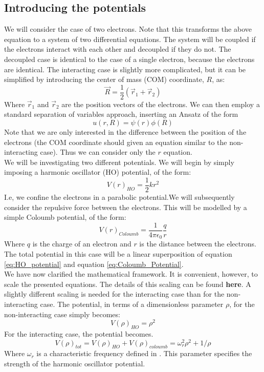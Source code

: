 \documentclass[a4paper, 10pt]{article}
\begin{document}
\subsection{Introducing the potentials}
We will consider the case of two electrons. Note that this transforms the above equation to a system of two differential equations. The system will be coupled if the electrons interact with each other and decoupled if they do not. The decoupled case is identical to the case of a single electron, because the electrons are identical. The interacting case is slightly more complicated, but it  can be simplified by introducing the center of mass (COM) coordinate, $R$, as:
$$\vec{R}=\frac{1}{2}\left(\vec{r}_1+\vec{r}_2\right)$$
Where $\vec{r}_1$ and $\vec{r}_2$ are the position vectors of the electrons. We can then employ a standard separation of variables approach, inserting an Ansatz of the form 
$$u(r,R)=\psi(r)\phi(R)$$
Note that we are only interested in the difference between the position of the electrons (the COM coordinate should given an equation similar to the non-interacting case). Thus we can consider only the $r$ equation.\\
\linebreak
We will be investigating two different potentials. We will begin by simply imposing a harmonic oscillator (HO) potential, of the form:
\begin{equation}\label{eq:HO_potential}
V(r)_{HO}=\frac{1}{2}kr^2
\end{equation}
I.e, we confine the electrons in a parabolic potential.We will subsequently consider the repulsive force between the electrons. This will be modelled by a simple Coloumb potential, of the form:
\begin{equation}\label{eq:Coloumb_Potential}
V(r)_{Coloumb}=\frac{1}{4\pi \epsilon_0}\frac{q}{r}
\end{equation}
Where $q$ is the charge of an electron and $r$ is the distance between the electrons. The total potential in this case will be a linear superposition of equation \ref{eq:HO_potential} and equation \ref{eq:Coloumb_Potential}.\\
\linebreak
We have now clarified the mathematical framework. It is convenient, however, to scale the presented equations. The details of this scaling can be found \textbf{here}. A slightly different scaling is needed for the interacting case than for the non-interacting case. The potential, in terms of a dimensionless parameter $\rho$, for the non-interacting case simply becomes:
$$V(\rho)_{HO}=\rho^2$$
For the interacting case, the potential becomes.
$$V(\rho)_{tot}=V(\rho)_{HO}+V(\rho)_{coloumb}=\omega_r^2\rho^2+1/\rho$$
Where $\omega_r$ is a characteristic frequency defined in \cite{Morten}. This parameter specifies the strength of the harmonic oscillator potential.
\end{document}
